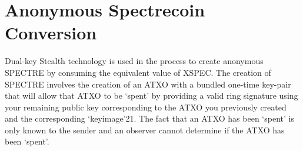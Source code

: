 \section{Anonymous Spectrecoin Conversion}
Dual-key Stealth technology is used in the process to create anonymous SPECTRE
by consuming the equivalent value of XSPEC. The creation of SPECTRE involves
the creation of an ATXO with a bundled one-time key-pair that will allow that
ATXO to be ‘spent’ by providing a valid ring signature using your remaining
public key corresponding to the ATXO you previously created and the
corresponding ‘keyimage’21. The fact that an ATXO has been ‘spent’ is only
known to the sender and an observer cannot determine if the ATXO has been
‘spent’.